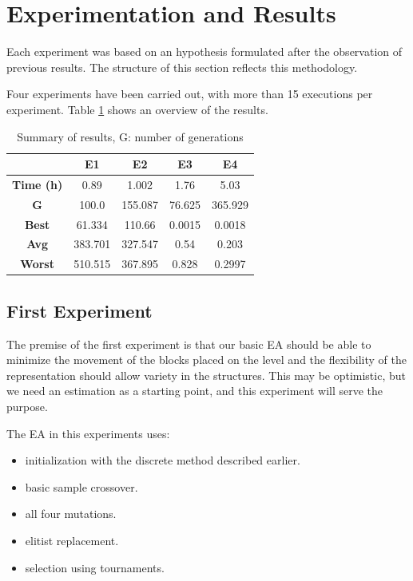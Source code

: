 \section{Experimentation and Results}\label{ch:res}
Each experiment was based on an hypothesis formulated after the observation of previous results. The structure of this section reflects this methodology.

Four experiments have been carried out, with more than 15 executions per experiment. Table \ref{t:resOver} shows an overview of the results.
\begin{table}[H]
	\myfloatalign
	\begin{tabular}{ccccc}
		& \textbf{E1} & \textbf{E2} & \textbf{E3} &\textbf{E4} \\ \hline
		\textbf{Time (h)} & 0.89 & 1.002 & 1.76 & 5.03 \\  \hline
		\textbf{G} &  100.0 & 155.087 & 76.625 & 365.929 \\  \hline
		\textbf{Best} & 61.334 & 110.66 & 0.0015 & 0.0018 \\  \hline
		\textbf{Avg} & 383.701 & 327.547 & 0.54 &  0.203 \\  \hline
		\textbf{Worst}  & 510.515 & 367.895 & 0.828 & 0.2997\\  \hline

		 \hline
	\end{tabular}
	\caption{Summary of results, G: number of generations}
	\label{t:resOver}
\end{table}

\subsection{First Experiment}
The premise of the first experiment is that our basic EA should be able to minimize the movement of the blocks placed on the level and the flexibility of the representation should allow variety in the structures. This may be optimistic, but we need an estimation as a starting point, and this experiment will serve the purpose. 

The EA in this experiments uses:
\begin{itemize}
	\item  initialization with the discrete method described earlier.
	\item  basic sample crossover.
	\item  all four mutations.
	\item  elitist replacement.
	\item  selection using tournaments.
\end{itemize}

